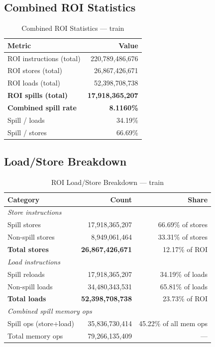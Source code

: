 \documentclass[conference]{IEEEtran}
\begin{document}
\subsection{Combined ROI Statistics}

\begin{table}[H]
\centering
\caption{Combined ROI Statistics --- train}
\label{tab:train_roi}
\begin{tabular}{lr}
\toprule
\textbf{Metric} & \textbf{Value} \\
\midrule
ROI instructions (total)   & 220,789,486,676 \\
ROI stores (total)         &  26,867,426,671 \\
ROI loads (total)          &  52,398,708,738 \\
\midrule
\textbf{ROI spills (total)} & \textbf{17,918,365,207} \\
\textbf{Combined spill rate} & \textbf{8.1160\%} \\
Spill / loads  & 34.19\% \\
Spill / stores & 66.69\% \\
\bottomrule
\end{tabular}
\end{table}

\subsection{Load/Store Breakdown}

\begin{table}[H]
\centering
\caption{ROI Load/Store Breakdown --- train}
\label{tab:train_lsbreakdown}
\begin{tabular}{lrr}
\toprule
\textbf{Category} & \textbf{Count} & \textbf{Share} \\
\midrule
\multicolumn{3}{l}{\textit{Store instructions}} \\
\quad Spill stores    & 17,918,365,207 & 66.69\% of stores \\
\quad Non-spill stores &  8,949,061,464 & 33.31\% of stores \\
\quad \textbf{Total stores} & \textbf{26,867,426,671} & 12.17\% of ROI \\
\midrule
\multicolumn{3}{l}{\textit{Load instructions}} \\
\quad Spill reloads   & 17,918,365,207 & 34.19\% of loads \\
\quad Non-spill loads & 34,480,343,531 & 65.81\% of loads \\
\quad \textbf{Total loads} & \textbf{52,398,708,738} & 23.73\% of ROI \\
\midrule
\multicolumn{3}{l}{\textit{Combined spill memory ops}} \\
\quad Spill ops (store+load) & 35,836,730,414 & 45.22\% of all mem ops \\
\quad Total memory ops       & 79,266,135,409 & --- \\
\bottomrule
\end{tabular}
\end{table}
\end{document}
